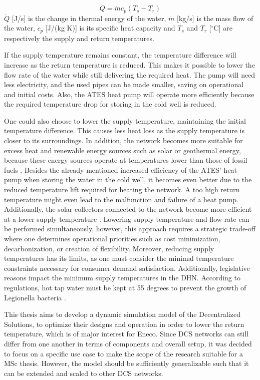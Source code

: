 \begin{equation}\label{eq::overallheat}
    \dot{Q} = \dot{m} c_p (T_s - T_r)
\end{equation}
$\dot{Q}$ [J/s] is the change in thermal energy of the water, $\dot{m}$ [kg/s] is the mass flow of the water, $c_p$ [J/(kg K)] is its specific heat capacity and $T_s$ and $T_r$ [$^{\circ}\text{C}$] are respectively the supply and return temperatures. 

If the supply temperature remains constant, the temperature difference will increase as the return temperature is reduced. This makes it possible to lower the flow rate of the water while still delivering the required heat. The pump will need less electricity, and the used pipes can be made smaller, saving on operational and initial costs. Also, the ATES heat pump will operate more efficiently because the required temperature drop for storing in the cold well is reduced.

One could also choose to lower the supply temperature, maintaining the initial temperature difference. This causes less heat loss as the supply temperature is closer to its surroundings. In addition, the network becomes more suitable for excess heat and renewable energy sources such as solar or geothermal energy, because these energy sources operate at temperatures lower than those of fossil fuels \cite{sustainableResources}. Besides the already mentioned increased efficiency of the ATES' heat pump when storing the water in the cold well, it becomes even better due to the reduced temperature lift required for heating the network. A too high return temperature might even lead to the malfunction and failure of a heat pump. Additionally, the solar collectors connected to the network become more efficient at a lower supply temperature \cite{booklowT}. Lowering supply temperature and flow rate can be performed simultaneously, however, this approach requires a strategic trade-off where one determines operational priorities such as cost minimization, decarbonization, or creation of flexibility. Moreover, reducing supply temperatures has its limits, as one must consider the minimal temperature constraints necessary for consumer demand satisfaction. Additionally, legislative reasons impact the minimum supply temperatures in the DHN. According to regulations, hot tap water must be kept at 55 degrees to prevent the growth of Legionella bacteria \cite{tapwaterWet}. 


This thesis aims to develop a dynamic simulation model of the Decentralized Solutions, to optimize their designs and operation in order to lower the return temperature, which is of major interest for Eneco. Since DCS networks can still differ from one another in terms of components and overall setup, it was decided to focus on a specific use case to make the scope of the research suitable for a MSc thesis. However, the model should be sufficiently generalizable such that it can be extended and scaled to other DCS networks.

